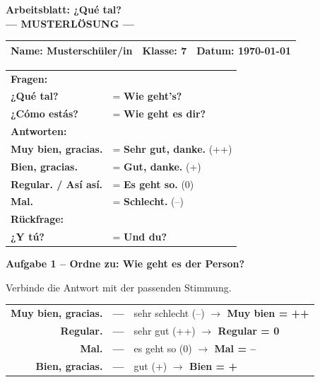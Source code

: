 \documentclass[11pt, a4paper]{article}
\newcommand{\fachfarbe}{spanisch}
\newcommand{\thema}{¿Qué tal?}
\newcommand{\klasse}{7}
\newcommand{\datum}{\today}
\newcommand{\punktebox}[1]{\hfill\fbox{\small \_/#1}}
\newcommand{\lsg}[1]{\textcolor{loesung}{\textbf{#1}}}
\newenvironment{aufgabe}[1]{%
    \needspace{5\baselineskip}%
    \nopagebreak[4]%
    \vspace{10pt}
    \noindent\textbf{\textcolor{\fachfarbe}{Aufgabe #1}}
    \nopagebreak[4]%
    \vspace{5pt}
    \nopagebreak[4]%
    \begin{list}{}{\leftmargin=0pt}
    \item[]
}{%
    \end{list}
}
\newcommand{\es}[1]{\textcolor{\fachfarbe}{\textbf{#1}}}
\begin{document}
\begin{center}
    {\Large\bfseries\textcolor{\fachfarbe}{Arbeitsblatt: \thema}}\\[0.3em]
    {\large\textcolor{loesung}{\textbf{--- MUSTERLÖSUNG ---}}}
\end{center}

\vspace{5pt}

\noindent
\begin{tabularx}{\textwidth}{|X|X|X|}
\hline
\textbf{Name:} \lsg{Musterschüler/in} &
\textbf{Klasse:} \klasse &
\textbf{Datum:} \datum \\
\hline
\end{tabularx}

\vspace{15pt}

\begin{merkkasten}

\begin{tabular}{ll}
\textbf{Fragen:} & \\[0.3em]
\es{¿Qué tal?} & = \lsg{Wie geht's?} \\[0.5em]
\es{¿Cómo estás?} & = \lsg{Wie geht es dir?} \\[0.8em]
\textbf{Antworten:} & \\[0.3em]
\es{Muy bien, gracias.} & = \lsg{Sehr gut, danke.} (++) \\[0.5em]
\es{Bien, gracias.} & = \lsg{Gut, danke.} (+) \\[0.5em]
\es{Regular. / Así así.} & = \lsg{Es geht so.} (0) \\[0.5em]
\es{Mal.} & = \lsg{Schlecht.} (--) \\[0.8em]
\textbf{Rückfrage:} & \\[0.3em]
\es{¿Y tú?} & = \lsg{Und du?} \\
\end{tabular}

\end{merkkasten}

\vspace{10pt}

\begin{aufgabe}{1 -- Ordne zu: Wie geht es der Person?}
Verbinde die Antwort mit der passenden Stimmung. \punktebox{4}
\end{aufgabe}

\begin{center}
\begin{tabular}{rcl}
\es{Muy bien, gracias.} & \lsg{---} & sehr schlecht (--) \lsg{$\rightarrow$ Muy bien = ++} \\[0.8em]
\es{Regular.} & \lsg{---} & sehr gut (++) \lsg{$\rightarrow$ Regular = 0} \\[0.8em]
\es{Mal.} & \lsg{---} & es geht so (0) \lsg{$\rightarrow$ Mal = --} \\[0.8em]
\es{Bien, gracias.} & \lsg{---} & gut (+) \lsg{$\rightarrow$ Bien = +} \\
\end{tabular}
\end{center}
\end{document}
